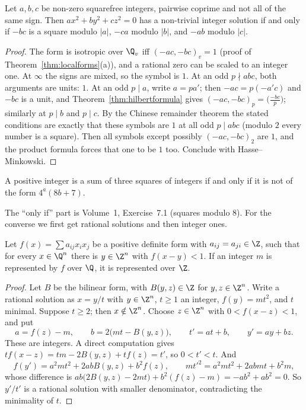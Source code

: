 \begin{theorem}[Legendre, 1785]\label{thm:legendre3}
Let $a,b,c$ be non-zero squarefree integers, pairwise coprime and not all of the same sign. Then $ax^2+by^2+cz^2=0$ has a
non-trivial integer solution if and only if $-bc$ is a square modulo $|a|$, $-ca$ modulo $|b|$, and $-ab$ modulo $|c|$.
\end{theorem}
\begin{proof}
The form is isotropic over $\Q_v$ iff $(-ac,-bc)_v=1$ (proof of Theorem~\ref{thm:localforms}(a)), and a rational zero can be scaled to
an integer one. At $\infty$ the signs are mixed, so the symbol is $1$. At an odd $p\nmid abc$, both arguments are units: $1$. At
an odd $p\mid a$, write $a=pa'$; then $-ac=p(-a'c)$ and $-bc$ is a unit, and Theorem~\ref{thm:hilbertformula} gives $(-ac,-bc)_p=
\bigl(\frac{-bc}p\bigr)$; similarly at $p\mid b$ and $p\mid c$. By the Chinese remainder theorem the stated conditions are exactly
that these symbols are $1$ at all odd $p\mid abc$ (modulo $2$ every number is a square). Then all symbols except possibly
$(-ac,-bc)_2$ are $1$, and the product formula forces that one to be $1$ too. Conclude with Hasse--Minkowski.
\end{proof}

\begin{theorem}\label{thm:threesq}
A positive integer is a sum of three squares of integers if and only if it is not of the form $4^a(8b+7)$.
\end{theorem}

The ``only if'' part is Volume~1, Exercise~7.1 (squares modulo $8$). For the converse we first get rational solutions and then
integer ones.

\begin{lemma}\label{lem:dc}
Let $f(x)=\sum a_{ij}x_ix_j$ be a positive definite form with $a_{ij}=a_{ji}\in\Z$, such that for every $x\in\Q^n$ there is $y\in
\Z^n$ with $f(x-y)<1$. If an integer $m$ is represented by $f$ over $\Q$, it is represented over $\Z$.
\end{lemma}
\begin{proof}
Let $B$ be the bilinear form, with $B(y,z)\in\Z$ for $y,z\in\Z^n$. Write a rational solution as $x=y/t$ with $y\in\Z^n$, $t\ge1$
an integer, $f(y)=mt^2$, and $t$ minimal. Suppose $t\ge2$; then $x\notin\Z^n$. Choose $z\in\Z^n$ with $0<f(x-z)<1$, and put
\[
a=f(z)-m,\qquad b=2\bigl(mt-B(y,z)\bigr),\qquad t'=at+b,\qquad y'=ay+bz.
\]
These are integers. A direct computation gives $tf(x-z)=tm-2B(y,z)+tf(z)=t'$, so $0<t'<t$. And
\[
f(y')=a^2mt^2+2abB(y,z)+b^2f(z),\qquad mt'^2=a^2mt^2+2abmt+b^2m,
\]
whose difference is $ab\bigl(2B(y,z)-2mt\bigr)+b^2(f(z)-m)=-ab^2+ab^2=0$. So $y'/t'$ is a rational solution with smaller
denominator, contradicting the minimality of $t$.
\end{proof}

